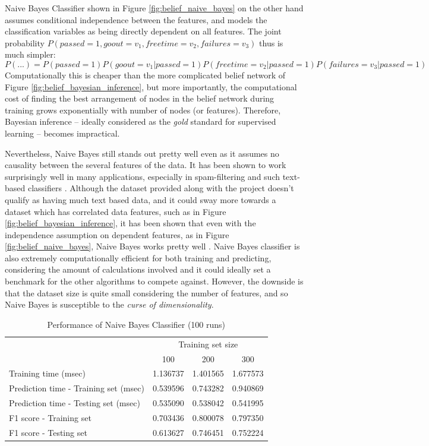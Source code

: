 \documentclass{article}
\begin{document}
	Naive Bayes Classifier shown in Figure \ref{fig:belief_naive_bayes} on the other hand assumes conditional independence between the features, and models the classification variables as being directly dependent on all features. The joint probability $P(passed=1, goout=v_1, freetime=v_2, failures=v_3)$ thus is much simpler: \[P(...) = P(passed=1)P(goout=v_1|passed=1)P(freetime=v_2|passed=1)P(failures=v_3|passed=1)\] 
	Computationally this is cheaper than the more complicated belief network of Figure \ref{fig:belief_bayesian_inference}, but more importantly, the computational cost of finding the best arrangement of nodes in the belief network during training grows exponentially with number of nodes (or features). Therefore, Bayesian inference -- ideally considered as the \emph{gold} standard for supervised learning -- becomes impractical. 
	
	Nevertheless, Naive Bayes still stands out pretty well even as it assumes no causality between the several features of the data. It has been shown to work surprisingly well in many applications, especially in spam-filtering and such text-based classifiers \cite{Metsis06}. Although the dataset provided along with the project doesn't qualify as having much text based data, and it could sway more towards a dataset which has correlated data features, such as in Figure \ref{fig:belief_bayesian_inference}, it has been shown that even with the independence assumption on dependent features, as in Figure \ref{fig:belief_naive_bayes}, Naive Bayes works pretty well \cite{Rish01}. Naive Bayes classifier is also extremely computationally efficient for both training and predicting, considering the amount of calculations involved and it could ideally set a benchmark for the other algorithms to compete against. However, the downside is that the dataset size is quite small considering the number of features, and so Naive Bayes is susceptible to the \emph{curse of dimensionality}.

	\begin{table}[h]
		\centering
		\begin{tabular}{l|ccc}
			\toprule
			{} & \multicolumn{3}{c}{Training set size} \\
			{} &       100 &       200 &       300 \\
			\midrule
			Training time (msec)                  &  1.136737 &  1.401565 &  1.677573 \\
			Prediction time - Training set (msec) &  0.539596 &  0.743282 &  0.940869 \\
			Prediction time - Testing set (msec)  &  0.535090 &  0.538042 &  0.541995 \\
			F1 score - Training set               &  0.703436 &  0.800078 &  0.797350 \\
			F1 score - Testing set                &  0.613627 &  0.746451 &  0.752224 \\
			\bottomrule
		\end{tabular}
		\caption{Performance of Naive Bayes Classifier (100 runs)}
		\label{tab:naive_bayes_100}
	\end{table}
	
\end{document}
